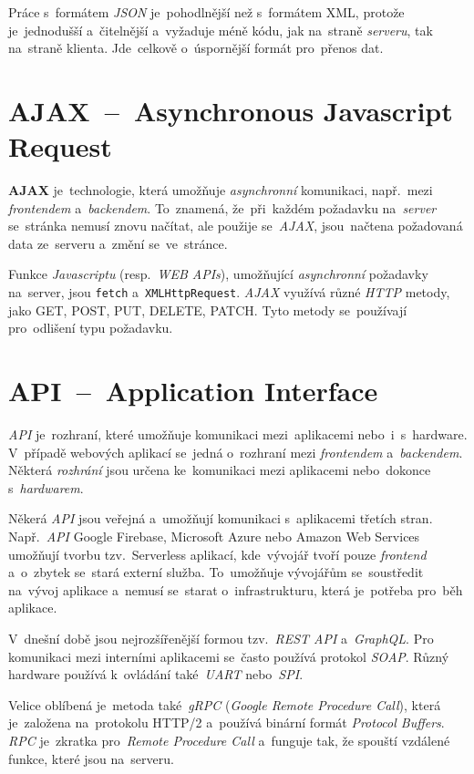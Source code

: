 \documentclass[11pt,a4paper]{report}
\begin{document}
            Práce s~formátem \emph{JSON} je~pohodlnější než s~formátem XML, protože je~jednodušší a~čitelnější a~vyžaduje méně kódu, jak na~straně \emph{serveru}, tak na~straně klienta. Jde~celkově o~úspornější formát pro~přenos dat.

        \section{AJAX~--~Asynchronous Javascript Request}
            \textbf{AJAX} je~technologie, která umožňuje \emph{asynchronní} komunikaci, např.~mezi \emph{frontendem} a~\emph{backendem}. To~znamená, že~při~každém požadavku na~\emph{server} se~stránka nemusí znovu načítat, ale použije se~\emph{AJAX}, jsou~načtena požadovaná data ze~serveru a~změní se~ve~stránce.

            Funkce \emph{Javascriptu} (resp.~\emph{WEB APIs}), umožňující \emph{asynchronní} požadavky na~server, jsou \texttt{fetch} a~\texttt{XMLHttpRequest}. \emph{AJAX} využívá různé \emph{HTTP} metody, jako GET, POST, PUT, DELETE, PATCH. Tyto metody se~používají pro~odlišení typu požadavku.\cite{ajax:mdn}

        \section{API~--~Application Interface}
            \emph{API} je~rozhraní, které umožňuje komunikaci mezi~aplikacemi nebo~i~s~hardware. V~případě webových aplikací se~jedná o~rozhraní mezi \emph{frontendem} a~\emph{backendem}. Některá \emph{rozhrání} jsou určena ke~komunikaci mezi aplikacemi nebo~dokonce s~\emph{hardwarem}.
            
            Někerá \emph{API} jsou veřejná a~umožňují komunikaci s~aplikacemi třetích stran. Např.~\emph{API} Google Firebase, Microsoft Azure nebo Amazon Web Services umožňují tvorbu tzv.~Serverless aplikací, kde~vývojář tvoří pouze \emph{frontend} a~o~zbytek se~stará externí služba. To~umožňuje vývojářům se~soustředit na~vývoj aplikace a~nemusí se~starat o~infrastrukturu, která je~potřeba pro~běh aplikace.

            V~dnešní době jsou nejrozšířenější formou tzv.~\emph{REST API} a~\emph{GraphQL}. Pro komunikaci mezi interními aplikacemi se~často používá protokol \emph{SOAP}. Různý hardware používá k~ovládání také~\emph{UART} nebo~\emph{SPI}.

            Velice oblíbená je~metoda také~\emph{gRPC} (\emph{Google Remote Procedure Call}), která je~založena na~protokolu HTTP/2 a~používá binární formát \emph{Protocol Buffers}. \emph{RPC} je~zkratka pro~\emph{Remote Procedure Call} a~funguje tak, že spouští vzdálené funkce, které jsou na~serveru.
            
\end{document}
